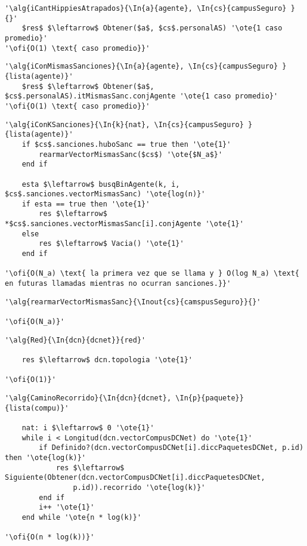 \begin{lstlisting}[mathescape]
'\alg{iCantHippiesAtrapados}{\In{a}{agente}, \In{cs}{campusSeguro} }{}'
	$res$ $\leftarrow$ Obtener($a$, $cs$.personalAS) '\ote{1 caso promedio}'
'\ofi{O(1) \text{ caso promedio}}'
\end{lstlisting}

\begin{lstlisting}[mathescape]
'\alg{iConMismasSanciones}{\In{a}{agente}, \In{cs}{campusSeguro} }{lista(agente)}'
	$res$ $\leftarrow$ Obtener($a$, $cs$.personalAS).itMismasSanc.conjAgente '\ote{1 caso promedio}'
'\ofi{O(1) \text{ caso promedio}}'
\end{lstlisting}

\begin{lstlisting}[mathescape]
'\alg{iConKSanciones}{\In{k}{nat}, \In{cs}{campusSeguro} }{lista(agente)}'
	if $cs$.sanciones.huboSanc == true then '\ote{1}'
		rearmarVectorMismasSanc($cs$) '\ote{$N_a$}'
	end if

	esta $\leftarrow$ busqBinAgente(k, i, $cs$.sanciones.vectorMismasSanc) '\ote{log(n)}'
	if esta == true then '\ote{1}'
		res $\leftarrow$ *$cs$.sanciones.vectorMismasSanc[i].conjAgente '\ote{1}'
	else
		res $\leftarrow$ Vacia() '\ote{1}'
	end if

'\ofi{O(N_a) \text{ la primera vez que se llama y } O(log N_a) \text{ en futuras llamadas mientras no ocurran sanciones.}}'
\end{lstlisting}

\begin{lstlisting}[mathescape]
'\alg{rearmarVectorMismasSanc}{\Inout{cs}{camspusSeguro}}{}'
	
'\ofi{O(N_a)}'
\end{lstlisting}


\begin{lstlisting}[mathescape]
'\alg{Red}{\In{dcn}{dcnet}}{red}'

	res $\leftarrow$ dcn.topologia '\ote{1}'

'\ofi{O(1)}'
\end{lstlisting}

\begin{lstlisting}[mathescape]
'\alg{CaminoRecorrido}{\In{dcn}{dcnet}, \In{p}{paquete}}{lista(compu)}'

	nat: i $\leftarrow$ 0 '\ote{1}'
	while i < Longitud(dcn.vectorCompusDCNet) do '\ote{1}'
		if Definido?(dcn.vectorCompusDCNet[i].diccPaquetesDCNet, p.id) then '\ote{log(k)}'
			res $\leftarrow$ Siguiente(Obtener(dcn.vectorCompusDCNet[i].diccPaquetesDCNet,
				p.id)).recorrido '\ote{log(k)}'
		end if
		i++ '\ote{1}'
	end while '\ote{n * log(k)}'

'\ofi{O(n * log(k))}'
\end{lstlisting}

